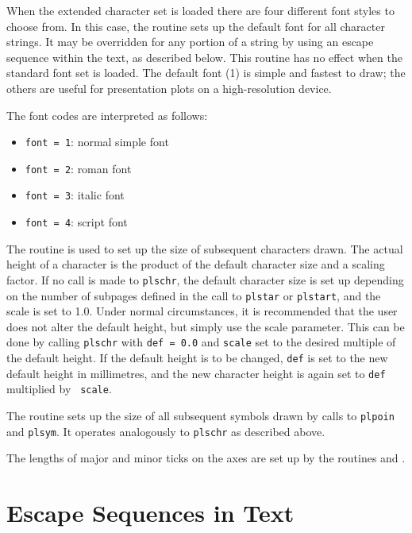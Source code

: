 When the extended character set is loaded there are four different font
styles to choose from.  In this case, the routine  sets up the
default font for all character strings.  It may be overridden for any
portion of a string by using an escape sequence within the text, as
described below.  This routine has no effect when the standard font set is
loaded.  The default font (1) is simple and fastest to draw; the others are
useful for presentation plots on a high-resolution device.

The font codes are interpreted as follows:
\begin{itemize}
   \item{\tt font = 1}: normal simple font
   \item{\tt font = 2}: roman font
   \item{\tt font = 3}: italic font
   \item{\tt font = 4}: script font
\end{itemize}

The routine  is used to set up the size of subsequent
characters drawn. The actual height of a character is the product of the
default character size and a scaling factor. If no call is made to
{\tt plschr}, the default character size is set up depending on the number
of subpages defined in the call to {\tt plstar} or {\tt plstart}, and the
scale is set to
1.0. Under normal circumstances, it is recommended that the user does not
alter the default height, but simply use the scale parameter. This can
be done by calling {\tt plschr} with {\tt def = 0.0} and {\tt scale} set to the
desired multiple of the default height. If the default height is to be
changed, {\tt def} is set to the new default height in millimetres, and
the new character height is again set to {\tt def} multiplied by {\tt
scale}.

The routine  sets up the size of all subsequent symbols
drawn by calls to {\tt plpoin} and {\tt plsym}. It operates analogously
to {\tt plschr} as described above.

The lengths of major and minor ticks on the axes are set up by the routines
 and .


\section {Escape Sequences in Text} \label{escape}

